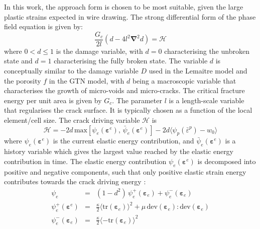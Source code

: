 \documentclass[sn-mathphys,Numbered]{sn-jnl}%
\newcommand{\bb}{\boldsymbol}
\begin{document}
In this work, the approach form \citet{borden_phase-field_2016} is chosen to be most suitable, given the large plastic strains expected in wire drawing.
The strong differential form of the phase field equation is given by:
\begin{equation} \label{eqn:phaseFieldEquation}
	\frac{G_c}{2l} \left(d - 4 l^2 \bb{\nabla}^2 d \right) = \mathcal{H} %
\end{equation}
where $0 < d \leq 1$ is the damage variable, with $d = 0$ characterising the unbroken state and $d = 1$ characterising the fully broken state. 
The variable $d$ is conceptually similar to the damage variable $D$ used in the Lemaitre model and the porosity $f$ in the GTN model, with $d$ being a macroscopic variable that characterises the growth of micro-voids and micro-cracks.
The critical fracture energy per unit area is given by $G_c$.
The parameter $l$ is a length-scale variable that regularises the crack surface. It is typically chosen as a function of the local element/cell size.
The crack driving variable $\mathcal{H}$ is
\begin{equation}
	\mathcal{H} %
	=
		-2d \,
		\text{max}
		\left[
			\psi_e
			\left(\bb{\varepsilon}^e\right), \,
			\bar{\psi}_{e}\left(\bb{\varepsilon}^e\right)
		\right]
	-2d
	\langle \psi_p({\bar{\varepsilon}}^p)-w_0 \rangle
\end{equation}
where $\psi_e \left(\bb{\varepsilon}^e\right)$ is the current elastic energy contribution, and $\bar{\psi}_e \left(\bb{\varepsilon}^e\right)$ is a history variable which gives the largest value reached by the elastic energy contribution in time.
The elastic energy contribution $\psi_e \left(\bb{\varepsilon}^e\right)$ is decomposed into positive and negative components, such that only positive elastic strain energy contributes towards the crack driving energy \citep{amor_regularized_2009}:
\begin{eqnarray}
	\psi_e &=&
	(1 - d^2) \, \psi_{e}^{+} \left(\bb{\varepsilon}_e \right)
	+ \psi_{e}^{-} \left(\bb{\varepsilon}_e \right) \\
	\psi_e^{+}\left(\bb{\varepsilon}^{e}\right) &=&
	\frac{\kappa}{2} \langle \text{tr}\left(\bb{\varepsilon}_{e}\right)\rangle^2
	+\mu \,\text{dev}(\bb{\varepsilon}_e): \text{dev}(\bb{\varepsilon}_e) \\
    	\psi_e^{-} \left(\bb{\varepsilon}_{e}\right) &=&
	\frac{\kappa}{2} \langle-\text{tr}\left(\bb{\varepsilon}_{e}\right) \rangle^2
\end{eqnarray}
\end{document}

